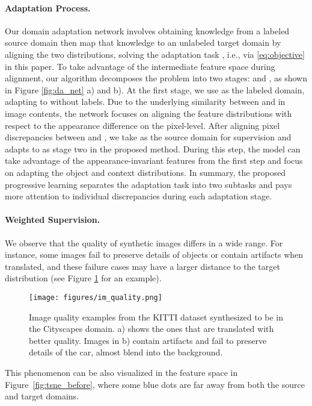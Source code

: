 \documentclass[10pt,twocolumn,letterpaper]{article}
\begin{document}
\vspace{-2mm}\paragraph{Adaptation Process.}
Our domain adaptation network involves obtaining knowledge from a labeled source domain  then map that knowledge to an unlabeled target domain  by aligning the two distributions, solving the adaptation task , i.e., via \eqref{eq:objective} in this paper.
To take advantage of the intermediate feature space during alignment, our algorithm decomposes the problem into two stages:  and , as shown in Figure \ref{fig:da_net} a) and b).
At the first stage, we use  as the labeled domain, adapting to  without labels.
Due to the underlying similarity between  and  in image contents, the network focuses on aligning the feature distributions with respect to the appearance difference on the pixel-level.
After aligning pixel discrepancies between  and , we take  as the source domain for supervision and adapts to  as stage two in the proposed method.
During this step, the model can take advantage of the appearance-invariant features from the first step and focus on adapting the object and context distributions.
In summary, the proposed progressive learning separates the adaptation task into two subtasks and pays more attention to individual discrepancies during each adaptation stage.

\vspace{-2mm}\paragraph{Weighted Supervision.}
We observe that the quality of synthetic images differs in a wide range.
For instance, some images fail to preserve details of objects or contain artifacts when translated, and these failure cases may have a larger distance to the target distribution (see Figure \ref{fig:im_quality} for an example).
\begin{figure}
		\begin{center}
        \texttt{[image: figures/im\_quality.png]}
		\end{center}
		\caption{
		Image quality examples from the KITTI dataset synthesized to be in the Cityscapes domain.
a) shows the ones that are translated with better quality.
Images in b) contain artifacts and fail to preserve details of the car, almost blend into the background.
}
		\label{fig:im_quality}
\vspace{-3mm}
\end{figure}
This phenomenon can be also visualized in the feature space in Figure~\ref{fig:tsne_before}, where some blue dots are far away from both the source and target domains.
\end{document}
